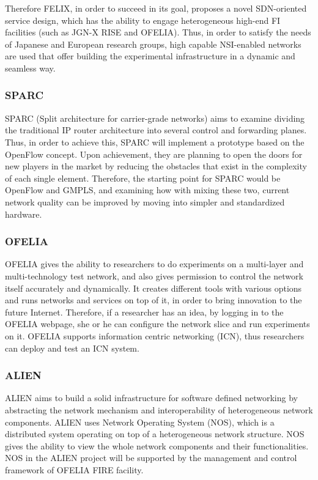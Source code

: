 Therefore FELIX, in order to succeed in its goal, proposes a novel SDN-oriented service design, which has the ability to engage heterogeneous high-end FI facilities (such as JGN-X RISE and OFELIA). Thus, in order to satisfy the needs of Japanese and European research groups, high capable NSI-enabled networks are used that offer building the experimental infrastructure in a dynamic and seamless way. 

\subsubsection{SPARC}

SPARC (Split architecture for carrier-grade networks) aims to examine dividing the traditional IP router architecture into several control and forwarding planes. Thus, in order to achieve this, SPARC will implement a prototype based on the OpenFlow concept. Upon achievement, they are planning to open the doors for new players in the market by reducing the obstacles that exist in the complexity of each single element. Therefore, the starting point for SPARC would be OpenFlow and GMPLS, and examining how with mixing these two, current network quality can be improved by moving into simpler and standardized hardware. \cite{SPARCproject}

\subsubsection{OFELIA}

OFELIA gives the ability to researchers to do experiments on a multi-layer and multi-technology test network, and also gives permission to control the network itself accurately and dynamically. It creates different tools with various options and runs networks and services on top of it, in order to bring innovation to the future Internet. Therefore, if a researcher has an idea, by logging in to the OFELIA webpage, she or he can configure the network slice and run experiments on it. OFELIA supports information centric networking (ICN), thus researchers can deploy and test an ICN system. \cite{OFELIAproject}   

\subsubsection{ALIEN}

ALIEN aims to build a solid infrastructure for software defined networking by abstracting the network mechanism and interoperability of heterogeneous network components. ALIEN uses Network Operating System (NOS), which is a distributed system operating on top of a heterogeneous network structure. NOS gives the ability to view the whole network components and their functionalities. NOS in the ALIEN project will be supported by the management and control framework of OFELIA FIRE facility. \cite{ALIENproject}

